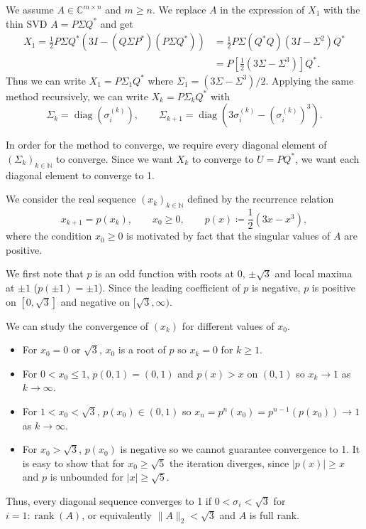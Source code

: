 \documentclass[10pt, A4paper]{article}
\newcommand{\mxn}{m \times n}
\DeclareMathOperator{\diag}{diag}
\DeclareMathOperator{\rank}{rank}
\begin{document}
We assume $A \in \mathbb{C}^{\mxn}$ and $m\geq n$. We replace $A$ in 
the expression of $X_1$ with the thin SVD $A = P \Sigma Q^*$ and get
\begin{align*}
	X_1 = \frac{1}{2}P \Sigma Q^*
	\left(3I - (Q\Sigma P^*) (P \Sigma Q^*)\right)
	   &= \frac{1}{2} P \Sigma (Q^* Q) (3I - \Sigma^2) Q^* \\
	   &= P \left[ \frac{1}{2} (3\Sigma - \Sigma^3) \right] Q^*.
\end{align*}
Thus we can write $X_1 = P \Sigma_1 Q^*$ where $\Sigma_1 = (3\Sigma - 
\Sigma^3)/2$.
Applying the same method recursively, we can write $X_k = P\Sigma_k 
Q^*$ 
with
$$
\Sigma_k = \diag(\sigma_i^{(k)}), \qquad \Sigma_{k+1} = \diag
\left(3\sigma_i^{(k)} - (\sigma_i^{(k)})^3\right).
$$

In order for the method to converge, we require every diagonal element 
of $(\Sigma_k)_{k\in\mathbb{N}}$ to converge. Since we want $X_k$ to 
converge to $U = PQ^*$, we want each diagonal element to converge to 1. 

We consider the real sequence $(x_k)_{k \in \mathbb{N}}$ defined by the 
recurrence relation
$$
	x_{k+1} = p(x_k), \qquad x_0 \geq 0, \qquad p(x) \coloneqq 
	\frac{1}{2} (3x - x^3),
$$
where the condition $x_0 \geq 0$ is motivated by fact that the 
singular values of $A$ are positive.

We first note that $p$ is an odd function with roots at 0, $\pm\sqrt{3}$
and local maxima at $\pm1$ ($p(\pm1) = \pm1$).
Since the leading coefficient of $p$ is negative, $p$ is positive on 
$[0,\sqrt{3}]$ and negative on $[\sqrt{3}, \infty)$.

We can study the convergence of $(x_k)$ for different values of $x_0$.
\begin{itemize}
	\item For $x_0 = 0$ or $\sqrt{3}$, $x_0$ is a root of $p$ so
	$x_k = 0$ for $k \geq 1$.
	\item For $0 < x_0 \leq 1$, $p(0,1) = (0, 1)$ and $p(x) > x$  on 
	$(0, 1)$ so $x_k \to 1$ as $k \to \infty$.
	\item For $1 < x_0 < \sqrt{3}$, $p(x_0) \in (0,1)$ so $x_n = 
	p^n(x_0) = p^{n-1}(p(x_0)) \to 1$ as $k \to \infty$.
	\item For $x_0 > \sqrt{3}$, $p(x_0)$ is negative so we cannot 
	guarantee convergence to 1. It is easy to show that for $x_0 \geq 
	\sqrt{5}$ the iteration diverges, since $|p(x)| \geq x$ and $p$ is 
	unbounded for $|x| \geq \sqrt{5}$.
\end{itemize}
Thus, every diagonal sequence converges to 1 if $0 < \sigma_i < 
\sqrt{3}$ for {$i = 1:\rank(A)$}, or equivalently $\|A\|_2 < \sqrt{3}$ 
and $A$ is full rank.
\end{document}
